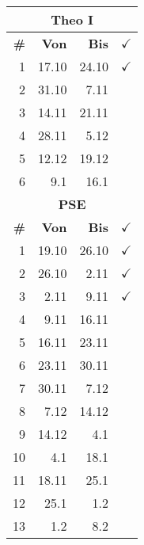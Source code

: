 \documentclass{article}
\begin{document}
\begin{table}
    \begin{tabular}{r|r|r|l}
        \multicolumn{4}{c}{\textbf{Theo I}}\\
        \hline
        \hline
        \textbf{\#}&
        \textbf{Von}&
        \textbf{Bis}&
        $\checkmark$\\
        \hline
        \hline
        \color{teal}
        1&17.10&24.10&$\checkmark$\\
        \color{black}
        \color{teal}
        2&31.10&7.11&\\
        3&14.11&21.11&\\
        4&28.11&5.12&\\
        5&12.12&19.12&\\
        6&9.1&16.1&\\
        \hline
        \hline

        \multicolumn{4}{c}{\textbf{PSE}}\\
        \hline
        \hline
        \textbf{\#}&
        \textbf{Von}&
        \textbf{Bis}&
        $\checkmark$\\
        \hline
        \hline
        \color{teal}
        1&19.10&26.10&$\checkmark$\\
        \color{teal}
        2&26.10&2.11&$\checkmark$\\
        \color{teal}
        3&2.11&9.11&$\checkmark$\\
        4&9.11&16.11\\
        5&16.11&23.11\\
        6&23.11&30.11\\
        7&30.11&7.12\\
        8&7.12&14.12\\
        9&14.12&4.1\\
        10&4.1&18.1\\
        11&18.11&25.1\\
        12&25.1&1.2\\
        13&1.2&8.2\\
        \hline
        \hline


\end{tabular}
\end{table}
\end{document}
